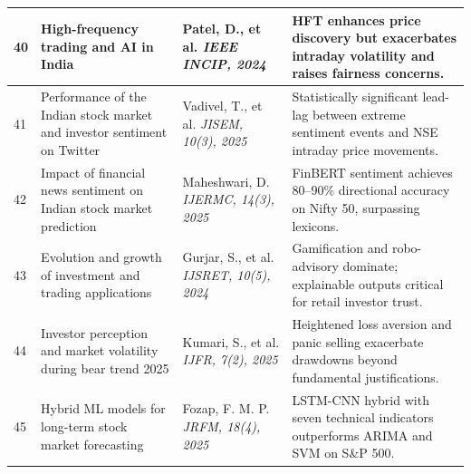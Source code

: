\documentclass[12pt,a4paper,oneside]{report}
\theoremstyle{definition}
\theoremstyle{remark}
\begin{document}
\begin{center}
\begin{longtable}{|p{0.8cm}|p{4.2cm}|>{\raggedright\arraybackslash}p{4cm}|p{4.5cm}|}
40 & High-frequency trading and AI in India \cite{PatelHFTIndia} & Patel, D., et al. \newline\newline \textit{IEEE INCIP, 2024} & HFT enhances price discovery but exacerbates intraday volatility and raises fairness concerns. \\ \hline



41 & Performance of the Indian stock market and investor sentiment on Twitter \cite{Vadivel2025TwitterSentiment} & Vadivel, T., et al. \newline\newline \textit{JISEM, 10(3), 2025} & Statistically significant lead-lag between extreme sentiment events and NSE intraday price movements. \\ \hline

42 & Impact of financial news sentiment on Indian stock market prediction \cite{Maheshwari2025NewsSentiment} & Maheshwari, D. \newline\newline \textit{IJERMC, 14(3), 2025} & FinBERT sentiment achieves 80--90\% directional accuracy on Nifty 50, surpassing lexicons. \\ \hline

43 & Evolution and growth of investment and trading applications \cite{Gurjar2024InvestmentApps} & Gurjar, S., et al. \newline\newline \textit{IJSRET, 10(5), 2024} & Gamification and robo-advisory dominate; explainable outputs critical for retail investor trust. \\ \hline

44 & Investor perception and market volatility during bear trend 2025 \cite{Kumari2025BearTrendBiases} & Kumari, S., et al. \newline\newline \textit{IJFR, 7(2), 2025} & Heightened loss aversion and panic selling exacerbate drawdowns beyond fundamental justifications. \\ \hline

45 & Hybrid ML models for long-term stock market forecasting \cite{Fozap2025HybridLSTMCNN} & Fozap, F. M. P. \newline\newline \textit{JRFM, 18(4), 2025} & LSTM-CNN hybrid with seven technical indicators outperforms ARIMA and SVM on S\&P 500. \\ \hline


\end{longtable}
\end{center}
\end{document}
